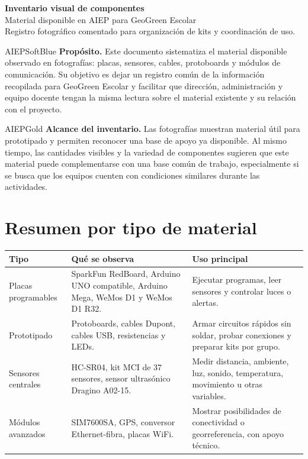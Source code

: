 \documentclass[11pt,a4paper]{article}
\begin{document}
\begin{tcolorbox}[enhanced, colback=AIEPNavy, colframe=AIEPNavy, arc=0mm,
  boxrule=0pt, left=5mm, right=5mm, top=5mm, bottom=5mm]
{\color{white}\Huge\bfseries Inventario visual de componentes}\\[2mm]
{\color{white}\Large Material disponible en AIEP para GeoGreen Escolar}\\[3mm]
{\color{AIEPSoftBlue} Registro fotográfico comentado para organización de kits y coordinación de uso.}
\end{tcolorbox}

\begin{infobox}{AIEPSoftBlue}
\textbf{Propósito.} Este documento sistematiza el material disponible observado en fotografías: placas, sensores, cables, protoboards y módulos de comunicación. Su objetivo es dejar un registro común de la información recopilada para GeoGreen Escolar y facilitar que dirección, administración y equipo docente tengan la misma lectura sobre el material existente y su relación con el proyecto.
\end{infobox}

\begin{infobox}{AIEPGold}
\textbf{Alcance del inventario.} Las fotografías muestran material útil para prototipado y permiten reconocer una base de apoyo ya disponible. Al mismo tiempo, las cantidades visibles y la variedad de componentes sugieren que este material puede complementarse con una base común de trabajo, especialmente si se busca que los equipos cuenten con condiciones similares durante las actividades.
\end{infobox}

\section{Resumen por tipo de material}

\begin{tabularx}{\linewidth}{L{3.2cm}Y Y}
\textbf{Tipo} & \textbf{Qué se observa} & \textbf{Uso principal} \\
\hline
Placas programables & SparkFun RedBoard, Arduino UNO compatible, Arduino Mega, WeMos D1 y WeMos D1 R32. & Ejecutar programas, leer sensores y controlar luces o alertas. \\
Prototipado & Protoboards, cables Dupont, cables USB, resistencias y LEDs. & Armar circuitos rápidos sin soldar, probar conexiones y preparar kits por grupo. \\
Sensores centrales & HC-SR04, kit MCI de 37 sensores, sensor ultrasónico Dragino A02-15. & Medir distancia, ambiente, luz, sonido, temperatura, movimiento u otras variables. \\
Módulos avanzados & SIM7600SA, GPS, conversor Ethernet-fibra, placas WiFi. & Mostrar posibilidades de conectividad o georreferencia, con apoyo técnico. \\
\end{tabularx}
\end{document}
